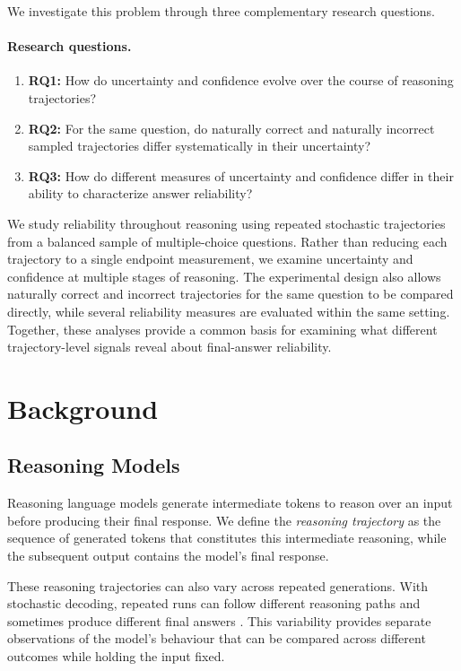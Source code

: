 \documentclass{article}
\begin{document}
We investigate this problem through three complementary research questions.

\paragraph{Research questions.}
\begin{enumerate}
\item \textbf{RQ1:} How do uncertainty and confidence evolve over the course of reasoning trajectories?

\item \textbf{RQ2:} For the same question, do naturally correct and naturally incorrect sampled trajectories differ systematically in their uncertainty?

\item \textbf{RQ3:} How do different measures of uncertainty and confidence differ in their ability to characterize answer reliability?
\end{enumerate}

We study reliability throughout reasoning using repeated stochastic trajectories from a balanced sample of multiple-choice questions. Rather than reducing each trajectory to a single endpoint measurement, we examine uncertainty and confidence at multiple stages of reasoning. The experimental design also allows naturally correct and incorrect trajectories for the same question to be compared directly, while several reliability measures are evaluated within the same setting. Together, these analyses provide a common basis for examining what different trajectory-level signals reveal about final-answer reliability.

\section{Background}
\label{sec:background}

\subsection{Reasoning Models}

Reasoning language models generate intermediate tokens to reason over an input before producing their final response. We define the \emph{reasoning trajectory} as the sequence of generated tokens that constitutes this intermediate reasoning, while the subsequent output contains the model's final response.

These reasoning trajectories can also vary across repeated generations. With stochastic decoding, repeated runs can follow different reasoning paths and sometimes produce different final answers \cite{wang2023selfconsistency}. This variability provides separate observations of the model's behaviour that can be compared across different outcomes while holding the input fixed.
\end{document}
